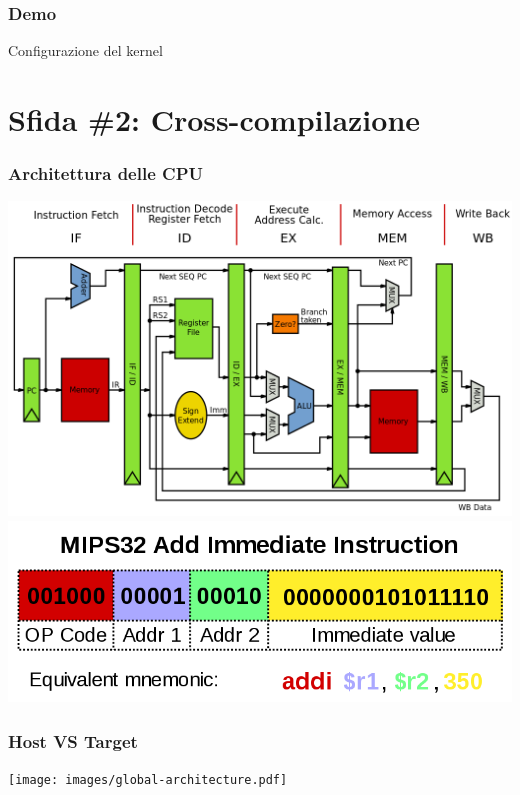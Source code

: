\documentclass[xetex,table]{beamer}
\begin{document}
\begin{frame}
\frametitle[Demo! Configurazione del kernel]{Demo}
  \begin{center}
    \LARGE
    Configurazione del kernel
  \end{center}
\end{frame}

\section{Sfida \#2: Cross-compilazione}

\begin{frame}
\frametitle{Architettura delle CPU}
  \begin{center}
    \includegraphics[height=0.6\textheight]{images/mips-architecture.png}\\
    \includegraphics[height=0.2\textheight]{images/mips32-instruction.png}
  \end{center}
\end{frame}

\begin{frame}
\frametitle{Host VS Target}
  \begin{center}
    \texttt{[image: images/global-architecture.pdf]}
  \end{center}
\end{frame}
\end{document}
